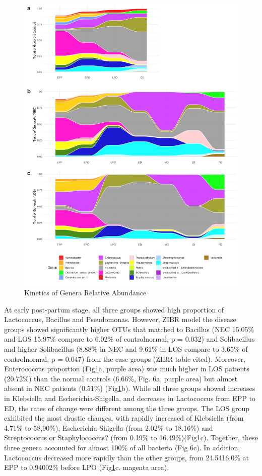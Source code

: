 \documentclass[fleqn,10pt]{wlpeerj} %
\begin{document}
  \begin{figure}[ht]\centering
    \includegraphics[width=\linewidth]{figure/taxon.pdf}
    \caption{Kinetics of Genera Relative Abundance}
    \label{fig:taxa-time}
  \end{figure}

    \noindent
    At early post-partum stage, all three groups showed high proportion of Lactococcus, Bacillus and Pseudomonas. However, ZIBR model the disease groups showed significantly higher OTUs that matched to Bacillus (NEC 15.05\% and LOS 15.97\% compare to 6.02\% of controlnormal, p = 0.032) and Solibacillus and higher Solibacillus (8.88\% in NEC and 9.61\% in LOS compare to 3.65\% of controlnormal, p = 0.047) from the case groups (ZIBR table cited). Moreover, Enterococcus proportion (Fig\ref{fig:taxa-time}a, purple area) was much higher in LOS patients (20.72\%) than the normal controls (6.66\%, Fig. 6a, purple area) but almost absent in NEC patients (0.51\%) (Fig\ref{fig:taxa-time}b).  While all three groups showed increases in Klebsiella and Escherichia-Shigella, and decreases in Lactococcus from EPP to ED, the rates of change were different among the three groups.  The LOS group exhibited the most drastic changes, with rapidly increased of Klebsiella (from 4.71\% to 58,90\%), Escherichia-Shigella (from 2.02\% to 18.16\%) and Streptococcus or Staphylococcus? (from 0.19\% to 16.49\%)(Fig\ref{fig:taxa-time}c).  Together, these three genera accounted for almost  100\% of all bacteria (Fig 6c).  In addition, Lactococcus decreased more rapidly than the other groups, from 24.5416.0\% at EPP to 0.94002\% before LPO (Fig\ref{fig:taxa-time}c. magenta area). \\
\end{document}
